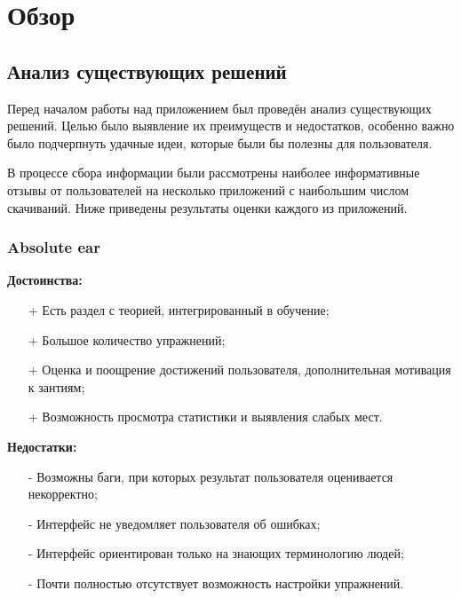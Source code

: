 \chapter{Обзор}
\section{Анализ существующих решений}
Перед началом работы над приложением был проведён анализ существующих решений. Целью было выявление их преимуществ и недостатков, особенно важно было подчерпнуть удачные идеи, которые были бы полезны для пользователя. \par
В процессе сбора информации были рассмотрены наиболее информативные отзывы от пользователей на несколько приложений с наибольшим числом скачиваний. Ниже приведены результаты оценки каждого из приложений.
\subsection[Absolute ear]{Absolute ear\cite{Apps1}}
\begin{minipage}[t]{0.45\textwidth}
\textbf{Достоинства:}
\begin{itemize}
  \item[+] Есть раздел с теорией, интегрированный в обучение;
  \item[+] Большое количество упражнений;
  \item[+] Оценка и поощрение достижений пользователя, дополнительная мотивация к зантиям;
  \item[+] Возможность просмотра статистики и выявления слабых мест.
\end{itemize}
\end{minipage}
\hfill
\begin{minipage}[t]{0.45\textwidth}
\textbf{Недостатки:}
\begin{itemize}
  \item[-] Возможны баги, при которых результат пользователя оценивается некорректно;
  \item[-] Интерфейс не уведомляет пользователя об ошибках;
  \item[-] Интерфейс ориентирован только на знающих терминологию людей;
  \item[-] Почти полностью отсутствует возможность настройки упражнений.
\end{itemize}
\end{minipage} 
